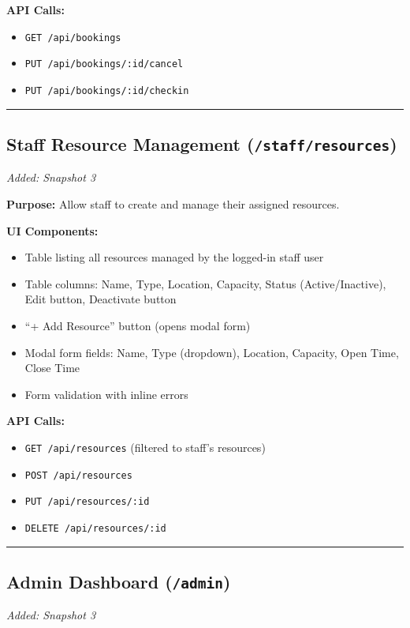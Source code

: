 \documentclass[12pt]{article}
\begin{document}
\textbf{API Calls:}
\begin{itemize}
    \item \texttt{GET /api/bookings}
    \item \texttt{PUT /api/bookings/:id/cancel}
    \item \texttt{PUT /api/bookings/:id/checkin}
\end{itemize}

\hrule\vspace{1em}

\subsection{Staff Resource Management (\texttt{/staff/resources})}
\textit{Added: Snapshot 3}

\textbf{Purpose:} Allow staff to create and manage their assigned resources.

\textbf{UI Components:}
\begin{itemize}
    \item Table listing all resources managed by the logged-in staff user
    \item Table columns: Name, Type, Location, Capacity, Status (Active/Inactive), Edit button, Deactivate button
    \item ``+ Add Resource'' button (opens modal form)
    \item Modal form fields: Name, Type (dropdown), Location, Capacity, Open Time, Close Time
    \item Form validation with inline errors
\end{itemize}

\textbf{API Calls:}
\begin{itemize}
    \item \texttt{GET /api/resources} (filtered to staff's resources)
    \item \texttt{POST /api/resources}
    \item \texttt{PUT /api/resources/:id}
    \item \texttt{DELETE /api/resources/:id}
\end{itemize}

\hrule\vspace{1em}

\subsection{Admin Dashboard (\texttt{/admin})}
\textit{Added: Snapshot 3}
\end{document}
